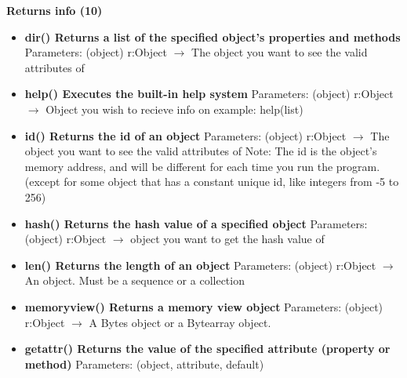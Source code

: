 \documentclass{report}
\begin{document}
      \begin{center}
        \textbf{Returns info (10)}
      \end{center}
      \begin{itemize}
        \item[\ding{43}] \textbf{dir()	Returns a list of the specified object's properties and methods}
          \smallbreak \noindent
          Parameters: (object)
          \smallbreak \noindent
          r:Object $\rightarrow$ 	The object you want to see the valid attributes of
          \smallbreak \noindent
        \item[\ding{43}] \textbf{help()	Executes the built-in help system}
          \smallbreak \noindent
          Parameters: (object)
          \smallbreak \noindent
          r:Object $\rightarrow$ Object you wish to recieve info on example: help(list)
          \smallbreak \noindent
        \item[\ding{43}] \textbf{id()	Returns the id of an object}
          \smallbreak \noindent
          Parameters: (object)
          \smallbreak \noindent
          r:Object $\rightarrow$ 	The object you want to see the valid attributes of
          \smallbreak \noindent
          Note: The id is the object's memory address, and will be different for each time you run the program. (except for some object that has a constant unique id, like integers from -5 to 256)
          \smallbreak \noindent
        \item[\ding{43}] \textbf{hash()	Returns the hash value of a specified object}
          \smallbreak \noindent
          Parameters: (object)
          \smallbreak \noindent
          r:Object $\rightarrow$ object you want to get the hash value of
          \smallbreak \noindent
        \item[\ding{43}] \textbf{len()	Returns the length of an object}
          \smallbreak \noindent
          Parameters: (object)
          \smallbreak \noindent
          r:Object $\rightarrow$ An object. Must be a sequence or a collection
          \smallbreak \noindent
        \item[\ding{43}] \textbf{memoryview()	Returns a memory view object}
          \smallbreak \noindent
          Parameters: (object)
          \smallbreak \noindent
          r:Object $\rightarrow$ 	A Bytes object or a Bytearray object.
          \smallbreak \noindent
        \item[\ding{43}] \textbf{getattr()	Returns the value of the specified attribute (property or method)}
          \smallbreak \noindent
          Parameters: (object, attribute, default)

\end{itemize}
\end{document}
